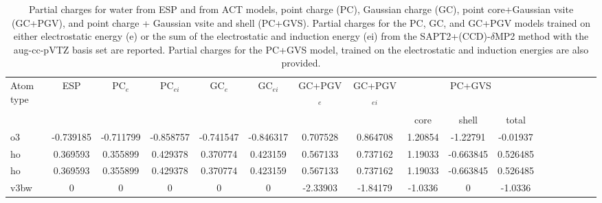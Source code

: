 \begin{sidewaystable}
\caption{Partial charges for water from ESP and from ACT models, point charge (PC), Gaussian charge (GC), point core+Gaussian vsite (GC+PGV), and point charge + Gaussian vsite and shell (PC+GVS).  Partial charges for the PC, GC, and GC+PGV models trained on either electrostatic energy (e) or the sum of the electrostatic and induction energy (ei) from the SAPT2+(CCD)-$\delta$MP2 method with the aug-cc-pVTZ basis set are reported. Partial charges for the PC+GVS model, trained on the electrostatic and induction energies are also provided.}
\hspace{-1cm}
\begin{tabular}{lcccccccccccccccc}
\hline
 Atom type & ESP & PC$_{e}$ & PC$_{ei}$ & GC$_{e}$ & GC$_{ei}$ & GC+PGV$_{e}$ & GC+PGV$_{ei}$ & \multicolumn{3}{c}{PC+GVS} \\\\
 & & & & & & & & core & shell & total \\
\hline
o3 & -0.739185 & -0.711799 & -0.858757 & -0.741547 & -0.846317 & 0.707528 & 0.864708 & 1.20854 & -1.22791 & -0.01937 \\
ho & 0.369593 & 0.355899 & 0.429378 & 0.370774 & 0.423159 & 0.567133 & 0.737162 & 1.19033 & -0.663845 & 0.526485 \\
ho & 0.369593 & 0.355899 & 0.429378 & 0.370774 & 0.423159 & 0.567133 & 0.737162 & 1.19033 & -0.663845 & 0.526485 \\
 v3bw & 0 & 0 & 0 & 0 & 0 & -2.33903 & -1.84179 & -1.0336 & 0 & -1.0336 \\
\hline
\end{tabular}
\end{sidewaystable}
